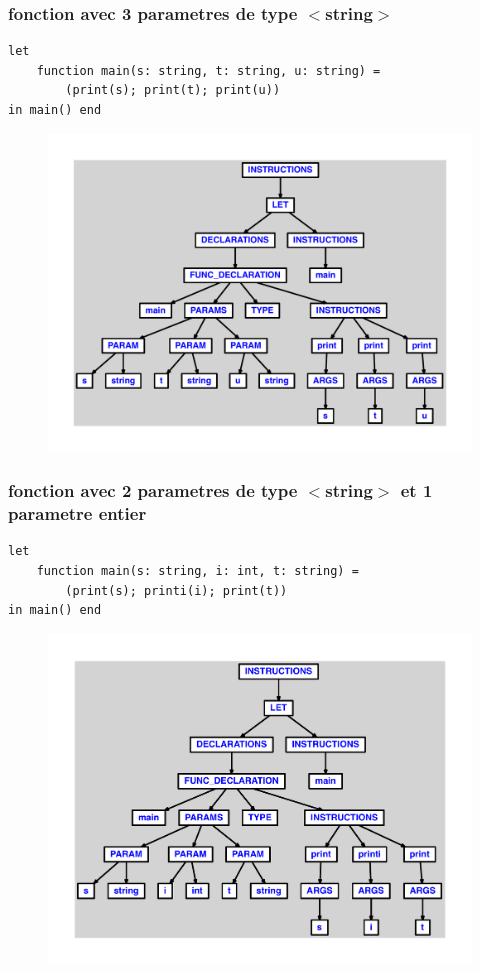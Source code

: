 \documentclass{article}
\begin{document}
\subsubsection{fonction avec 3 parametres de type $ < $string$ > $}
\begin{lstlisting}
let
	function main(s: string, t: string, u: string) =
		(print(s); print(t); print(u))
in main() end
\end{lstlisting}
\newpage
\begin{figure}[H]
\centering
\includegraphics[max width=\textwidth]{ast/ast_242.pdf}
\end{figure}
\newpage
\subsubsection{fonction avec 2 parametres de type $ < $string$ > $ et 1 parametre entier}
\begin{lstlisting}
let
	function main(s: string, i: int, t: string) =
		(print(s); printi(i); print(t))
in main() end
\end{lstlisting}
\newpage
\begin{figure}[H]
\centering
\includegraphics[max width=\textwidth]{ast/ast_243.pdf}
\end{figure}
\newpage
\end{document}
